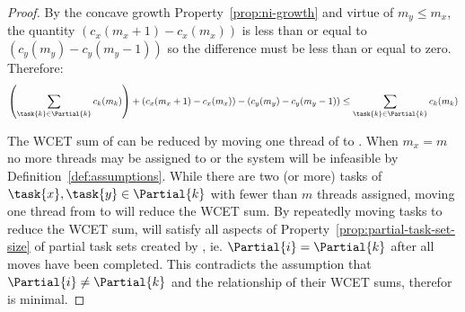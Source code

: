 \begin{theorem}
\begin{proof}
    By the concave growth Property~\ref{prop:ni-growth} and virtue of
    ${m_y \le m_x}$, the quantity ${(c_x(m_x + 1) - c_x(m_x))}$ is
    less than or equal to ${(c_y(m_y) - c_y(m_y - 1))}$ so the
    difference must be less than or equal to zero. Therefore:
    \begin{equation*}
      \left(\sum_{\task{k} \in \Partial{k}} c_k(m_k) \right)
      + (c_x(m_x + 1) - c_x(m_x)) - (c_y(m_y) - c_y(m_y - 1)) \le 
      \sum_{\task{k} \in \Partial{k}} c_k(m_k)
    \end{equation*}

    The WCET sum of  can be reduced by moving one thread of
     to . When ${m_x = m}$ no more threads may be
    assigned to  or the system will be infeasible by
    Definition~\ref{def:assumptions}. While there are two (or more)
    tasks of ${\task{x}, \task{y} \in \Partial{k}}$ with fewer than
    ${m}$ threads assigned, moving one thread from  to
     will reduce the WCET sum. By repeatedly moving tasks to
    reduce the WCET sum,  will satisfy all aspects of
    Property~\ref{prop:partial-task-set-size} of partial task sets
    created by \texdivide{}, ie. ${\Partial{i} = \Partial{k}}$ after
    all moves have been completed. This contradicts the assumption
    that ${\Partial{i} \not = \Partial{k}}$ and the relationship of
    their WCET sums, therefor  is minimal.
  \end{proof}
\end{theorem}
